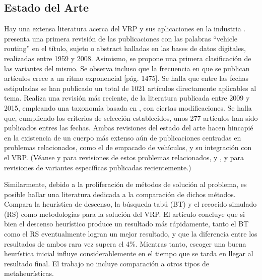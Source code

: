 \documentclass[12pt]{extarticle}
\begin{document}
\subsection{Estado del Arte}
Hay una extensa literatura acerca del VRP y sus aplicaciones en la industria
\cite{pillac_review_2013} \cite{gomez_metaheuristicas_2014}.
\cite{eksioglu_vehicle_2009} presenta una primera revisión de las publicaciones
con las palabras ``vehicle routing'' en el título, sujeto o abstract halladas en
las bases de datos digitales, realizadas entre 1959 y 2008. Asimismo, se propone
una primera clasificación de las variantes del mismo. Se observa incluso que la
frecuencia en que se publican artículos crece a un ritmo exponencial [pág.
1475]. Se halla que entre las fechas estipuladas se han publicado un total de
1021 artículos directamente aplicables al tema. \cite{braekers_vehicle_2016}
Realiza una revisión más reciente, de la literatura publicada entre 2009 y 2015,
empleando una taxonomía basada en \cite{eksioglu_vehicle_2009}, con ciertas
modificaciones. Se halla que, cumpliendo los criterios de selección
establecidos, unos 277 artículos han sido publicados entres las fechas. Ambas
revisiones del estado del arte hacen hincapié en la existencia de un cuerpo más
extenso aún de publicaciones centradas en problemas relacionados, como el de
empacado de vehículos, y su integración con el VRP. (Véanse
\cite{prodhon_survey_2014} \cite{pollaris_vehicle_2015} y
\cite{golden_inventory_2008} para revisiones de estos problemas relacionados, y
\cite{pillac_review_2013}, \cite{groer_consistent_2009} y
\cite{caceres-cruz_rich_2015} para revisiones de variantes específicas
publicadas recientemente.) 

Similarmente, debido a la proliferación de métodos de solución al problema, es
posible hallar una literatura dedicada a la comparación de dichos métodos.
\cite{breedam_comparing_2001} Compara la heurística de descenso, la búsqueda
tabú (BT) y el recocido simulado (RS) como metodologías para la solución del
VRP. El artículo concluye que si bien el descenso heurístico produce un
resultado más rápidamente, tanto el BT como el RS eventualmente logran un mejor
resultado, y que la diferencia entre los resultados de ambos rara vez supera el
4\%. Mientras tanto, escoger una buena heurística inicial influye
considerablemente en el tiempo que se tarda en llegar al resultado final. El
trabajo no incluye comparación a otros tipos de metaheurísticas.
\end{document}
